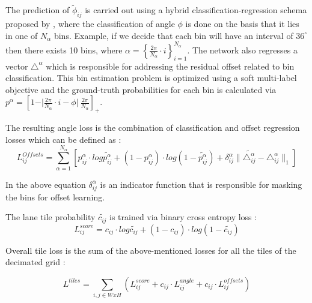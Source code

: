              The prediction of $\widetilde{\phi}_{ij}$ is carried out using a hybrid classification-regression schema proposed by \cite{DBLP:journals/corr/abs-1805-03225}, where the classification of angle $\phi$ is done on the basis that it lies in one of $N_{\alpha}$ bins. Example, if we decide that each bin will have an interval of $36^{\circ}$ then there exists 10 bins, where $\alpha = \left\{\frac{2\pi}{N_{\alpha} } \cdot i \right\}^{N_{\alpha}}_{i =1} $. The network also regresses a vector $\triangle^{\alpha}$ which is responsible for addressing the residual offset related to bin classification. This \cite{DBLP:journals/corr/abs-2011-01535} bin estimation problem is optimized using a soft multi-label objective and the ground-truth probabilities for each bin is calculated via \cite{DBLP:journals/corr/abs-2011-01535}$ p^{\alpha} = [1 - \vert \frac{2\pi}{N_{\alpha}} \cdot i  - \phi  \vert \ \frac{2\pi}{N_{\alpha}} ]_{+}$.
             
             The resulting angle loss is the combination of classification and offset regression losses which can be defined as \cite{DBLP:journals/corr/abs-2011-01535}:
             \begin{equation}
                 L_{ij}^{Offsets} = \sum_{\alpha=1}^{N_{\alpha}}[p^{\alpha}_{ij} \cdot log \tilde{p^{\alpha}_{ij}} + (1 - p^{\alpha}_{ij}) \cdot log(1 - \tilde{p^{\alpha}_{ij}}) + \delta^{\alpha}_{ij} \parallel   \tilde{\triangle^{\alpha}_{ij}} - \triangle^{\alpha}_{ij} \parallel_{1} ] 
             \end{equation}
             
             In the above equation $\delta^{\alpha}_{ij}$ is an indicator function that is responsible for \cite{DBLP:journals/corr/abs-2011-01535} masking the bins for offset learning. 
             
             The lane tile probability $\widetilde{c_{ij}}$ is trained via binary cross entropy loss \cite{DBLP:journals/corr/abs-2011-01535}:
             \begin{equation}
                 L_{ij}^{score} = c_{ij} \cdot log \widetilde{c_{ij}} + (1 - c_{ij}) \cdot log
                    (1-  \widetilde{c_{ij}})
             \end{equation}
             
             Overall tile loss is the sum of the above-mentioned losses for all the tiles of the decimated grid \cite{DBLP:journals/corr/abs-2011-01535}:
             
            \begin{equation}
                L^{tiles} = \sum_{i,j \in WxH}(L^{score}_{ij} +c_{ij} \cdot L^{angle}_{ij} + c_{ij} \cdot L^{offsets}_{ij}  )
            \end{equation}
            
